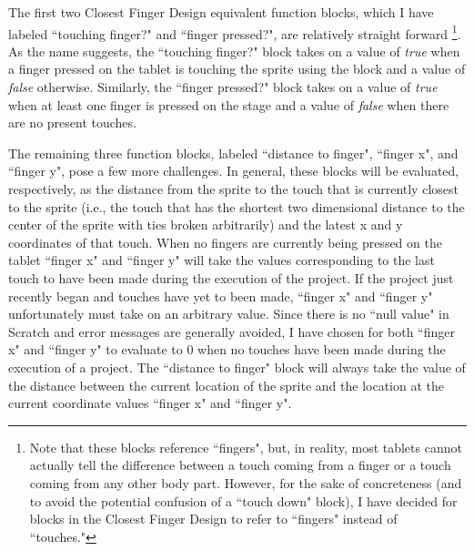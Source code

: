 The first two Closest Finger Design equivalent function blocks, which I have labeled ``touching finger?" and ``finger pressed?", are relatively straight forward
\footnote{Note that these blocks reference ``fingers", but, in reality, most tablets cannot actually tell the difference between a touch coming from a finger or a touch coming from any other body part. However, for the sake of concreteness (and to avoid the potential confusion of a ``touch down" block), I have decided for blocks in the Closest Finger Design to refer to ``fingers" instead of ``touches."}.
As the name suggests, the ``touching finger?" block takes on a value of \emph{true} when a finger pressed on the tablet is touching the sprite using the block and a value of \emph{false} otherwise. Similarly, the ``finger pressed?" block takes on a value of \emph{true} when at least one finger is pressed on the stage and a value of \emph{false} when there are no present touches.

The remaining three function blocks, labeled ``distance to finger", ``finger x", and ``finger y",  pose a few more challenges. In general, these blocks will be evaluated, respectively, as the distance from the sprite to the touch that is currently closest to the sprite (i.e., the touch that has the shortest two dimensional distance to the center of the sprite with ties broken arbitrarily) and the latest x and y coordinates of that touch. When no fingers are currently being pressed on the tablet ``finger x" and ``finger y" will take the values corresponding to the last touch to have been made during the execution of the project. If the project just recently began and touches have yet to been made, ``finger x" and ``finger y" unfortunately must take on an arbitrary value. Since there is no ``null value" in Scratch and error messages are generally avoided, I have chosen for both ``finger x" and ``finger y" to evaluate to $0$ when no touches have been made during the execution of a project. The ``distance to finger" block will always take the value of the distance between the current location of the sprite and the location at the current coordinate values ``finger x" and ``finger y".


